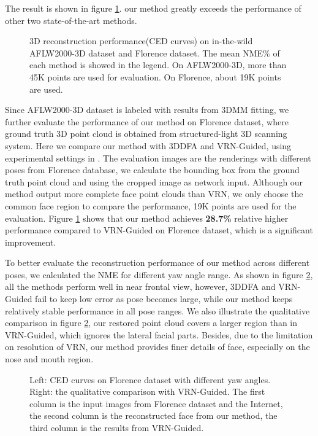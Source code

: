 \documentclass[runningheads]{llncs}
\begin{document}
The result is shown in figure \ref{fig: reconstruction}. our method greatly exceeds the performance of other two state-of-the-art methods.
\begin{figure}
  \vspace{-3mm}
  \centering
  \caption{3D reconstruction performance(CED curves) on in-the-wild AFLW2000-3D dataset and Florence dataset. The mean NME\%  of each method is showed in the legend. On AFLW2000-3D, more than 45K points are used for evaluation. On Florence, about 19K points are used. }
  \label{fig: reconstruction} 
  \vspace{-3mm}
\end{figure} 
Since AFLW2000-3D dataset is labeled with results from 3DMM fitting, we further evaluate the performance of our method on Florence dataset, where ground truth 3D point cloud is obtained from structured-light 3D scanning system.
Here we compare our method with 3DDFA and VRN-Guided\cite{Jackson2017Large}, using experimental settings in \cite{Jackson2017Large}. The evaluation images are the renderings with different poses from Florence database, we calculate the bounding box from the ground truth point cloud and using the cropped image as network input. 
Although our method output more complete face point clouds than VRN, we only choose the common face region to compare the performance, 19K points are used for the evaluation.
Figure \ref{fig: reconstruction} shows that our method achieves \textbf{28.7\%} relative higher performance compared to VRN-Guided on Florence dataset, which is a significant improvement.

To better evaluate the reconstruction performance of our method across different poses, we calculated the NME for different yaw angle range. As shown in figure \ref{fig: comparison}, all the methods perform well in near frontal view, however, 3DDFA and VRN-Guided fail to keep low error as pose becomes large, while our method keeps relatively stable performance in all pose ranges. 
We also illustrate the qualitative comparison in figure \ref{fig: comparison}, our restored point cloud covers a larger region than in VRN-Guided, which ignores the lateral facial parts. 
Besides, due to the limitation on resolution of VRN, our method provides finer details of face, especially on the nose and mouth region.
\begin{figure}
  \vspace{-3mm}
  \centering
\caption{Left: CED curves on Florence dataset with different yaw angles. Right: the qualitative comparison with VRN-Guided. The first column is the input images from Florence dataset and the Internet, the second column is the reconstructed face from our method, the third column is the results from VRN-Guided.}
  \label{fig: comparison} \vspace{-3mm}
\end{figure}
\end{document}
